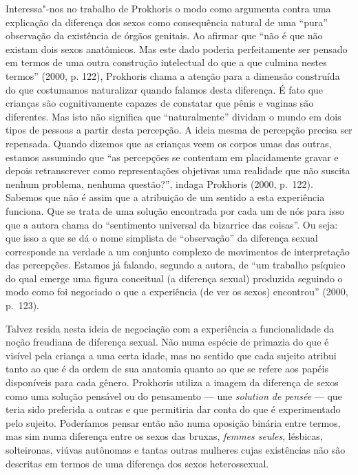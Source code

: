 Interessa"-nos no trabalho de Prokhoris o modo como argumenta contra uma
explicação da diferença dos sexos como consequência natural de uma
``pura'' observação da existência de órgãos genitais. Ao afirmar que
``não é que não existam dois sexos anatômicos. Mas este dado poderia
perfeitamente ser pensado em termos de uma outra construção intelectual
do que a que culmina nestes termos'' (2000, p. 122), Prokhoris chama a atenção para a dimensão construída do que costumamos naturalizar quando falamos desta diferença. É fato que
crianças são cognitivamente capazes de constatar que pênis e vaginas são
diferentes. Mas isto não significa que ``naturalmente'' dividam o mundo
em dois tipos de pessoas a partir desta percepção. A ideia mesma de
percepção precisa ser repensada. Quando dizemos que as crianças veem os
corpos umas das outras, estamos assumindo que ``as percepções se
contentam em placidamente gravar e depois retranscrever como
representações objetivas uma realidade que não suscita nenhum problema,
nenhuma questão?'', indaga Prokhoris (2000, p.~122). Sabemos que
não é assim que a atribuição de um sentido a esta experiência funciona.
Que se trata de uma solução encontrada por cada um de nós para isso que
a autora chama do ``sentimento universal da bizarrice das coisas''. Ou
seja: que isso a que se dá o nome simplista de ``observação'' da
diferença sexual corresponde na verdade a um conjunto complexo de
movimentos de interpretação das percepções. Estamos já falando, segundo
a autora, de ``um trabalho psíquico do qual emerge uma figura conceitual
(a diferença sexual) produzida seguindo o modo como foi negociado o que
a experiência (de ver os sexos) encontrou'' (2000, p.~123).

Talvez resida nesta ideia de negociação com a experiência a
funcionalidade da noção freudiana de diferença sexual. Não numa espécie
de primazia do que é visível pela criança a uma certa idade, mas no
sentido que cada sujeito atribui tanto ao que é da ordem de sua anatomia
quanto ao que se refere aos papéis disponíveis para cada gênero.
Prokhoris utiliza a imagem da diferença de sexos como uma solução
pensável ou do pensamento --- une \emph{solution de pensée} --- que teria
sido preferida a outras e que permitiria dar conta do que é
experimentado pelo sujeito. Poderíamos pensar então não numa oposição
binária entre termos, mas sim numa diferença entre os sexos das bruxas,
\emph{femmes seules}, lésbicas, solteironas, viúvas autônomas e tantas
outras mulheres cujas existências não são descritas em termos de uma
diferença dos sexos heterossexual.

